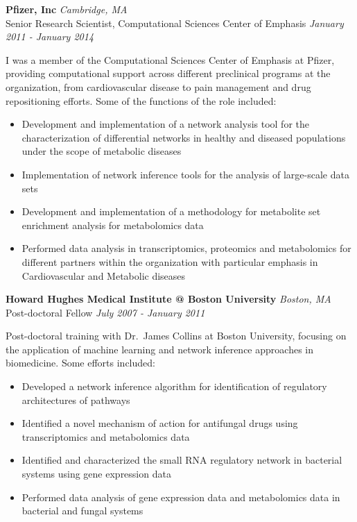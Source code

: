 \documentclass[11pt,a4paper,]{awesome-cv}
\providecommand{\tightlist}{%
	\setlength{\itemsep}{0pt}\setlength{\parskip}{0pt}}
\begin{document}
\textbf{{Pfizer, Inc}} \hfill \emph{Cambridge, MA}\\
Senior Research Scientist, Computational Sciences Center of Emphasis
\hfill \emph{January 2011 - January 2014}

I was a member of the Computational Sciences Center of Emphasis at
Pfizer, providing computational support across different preclinical
programs at the organization, from cardiovascular disease to pain
management and drug repositioning efforts. Some of the functions of the
role included:

\begin{itemize}
\tightlist
\item
  Development and implementation of a network analysis tool for the
  characterization of differential networks in healthy and diseased
  populations under the scope of metabolic diseases
\item
  Implementation of network inference tools for the analysis of
  large-scale data sets
\item
  Development and implementation of a methodology for metabolite set
  enrichment analysis for metabolomics data
\item
  Performed data analysis in transcriptomics, proteomics and
  metabolomics for different partners within the organization with
  particular emphasis in Cardiovascular and Metabolic diseases
\end{itemize}

\textbf{{Howard Hughes Medical Institute @ Boston University}}
\hfill \emph{Boston, MA}\\
Post-doctoral Fellow \hfill \emph{July 2007 - January 2011}

Post-doctoral training with Dr.~James Collins at Boston University,
focusing on the application of machine learning and network inference
approaches in biomedicine. Some efforts included:

\begin{itemize}
\tightlist
\item
  Developed a network inference algorithm for identification of
  regulatory architectures of pathways
\item
  Identified a novel mechanism of action for antifungal drugs using
  transcriptomics and metabolomics data
\item
  Identified and characterized the small RNA regulatory network in
  bacterial systems using gene expression data
\item
  Performed data analysis of gene expression data and metabolomics data
  in bacterial and fungal systems
\end{itemize}
\end{document}
